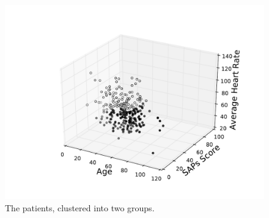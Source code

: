 \documentclass[fleqn,10pt]{wlscirep}
\begin{document}
\begin{figure}[ht]
                \centering
        \includegraphics[width=\linewidth]{figures/2clusters}
       \caption{The patients, clustered into two groups.}
       \label{fig:clusteredpatients}
\end{figure}
\end{document}
